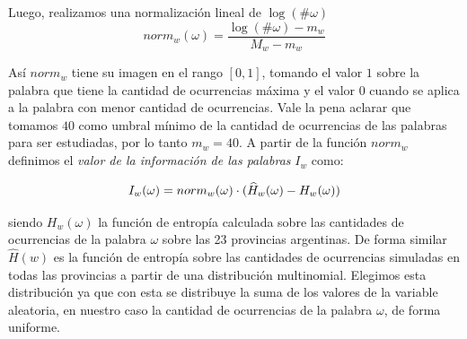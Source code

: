 Luego, realizamos una normalización lineal de $\log(\# \omega)$ 
\begin{equation}
  norm_w(\omega) = \frac{\log(\# \omega) - m_w}{M_w - m_w}
\end{equation}








Así $norm_w$ tiene su imagen en el rango $[0,1]$, tomando el valor $1$ sobre la palabra que tiene la cantidad de ocurrencias máxima y el valor $0$ cuando se aplica a la palabra con menor cantidad de ocurrencias. Vale la pena aclarar que tomamos $40$ como umbral mínimo de la cantidad de ocurrencias de las palabras para ser estudiadas, por lo tanto $m_w = 40 $.
A partir de la función $norm_w$ definimos el \textit{valor de la información de las palabras} $I_w$ como:

\begin{equation}
I_w(\omega) = norm_{w}(\omega) \cdot (\widehat{H}_{w}(\omega) - H_{w}(\omega)) \\
\label{eq:iw}
\end{equation}

siendo $H_w(\omega)$ la función de entropía calculada sobre las cantidades de ocurrencias de la palabra $\omega$ sobre las 23 provincias argentinas. De forma similar $\widehat{H}(w)$ es la función de entropía sobre las cantidades de ocurrencias simuladas en todas las provincias a partir de una distribución multinomial. Elegimos esta distribución ya que con esta se distribuye la suma de los valores de la variable aleatoria, en nuestro caso la cantidad de ocurrencias de la palabra $\omega$, de forma uniforme.%


